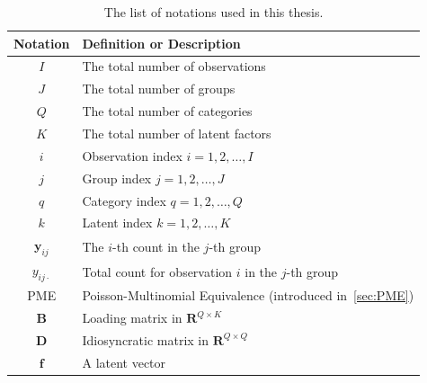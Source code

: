 \newpage
\begin{table}[H]
\centering
\caption{The list of notations used in this thesis.}\label{tab:notation}

\begin{tabular}{cl}
\toprule
\textbf{Notation}    & \textbf{Definition or Description}               \\ 
\midrule
$I$ & The total number of observations \\
$J$ & The total number of groups \\
$Q$ & The total number of categories \\
$K$ & The total number of latent factors \\
$i$                    & Observation index $i=1,2,\dots,I$           \\
$j$                    & Group index $j=1,2,\dots,J$                 \\
$q$                    & Category index $q=1,2,\dots,Q$              \\
$k$                    & Latent index $k=1,2,\dots,K$                \\
$\bm{y}_{ij}$                     & The $i$-th count in the $j$-th group                                                 \\
$y_{ij\cdot}$                     & Total count for observation $i$ in the $j$-th group                                                 \\
PME                     & Poisson-Multinomial Equivalence (introduced in~\ref{sec:PME})                                                 \\
$\mathbf{B}$                    & Loading matrix in $\mathbf{R}^{Q\times K}$       \\
$\mathbf{D}$                    & Idiosyncratic matrix in $\mathbf{R}^{Q\times Q}$ \\
$\mathbf{f}$                     & A latent vector                                                 \\
\bottomrule
\end{tabular}
\end{table}